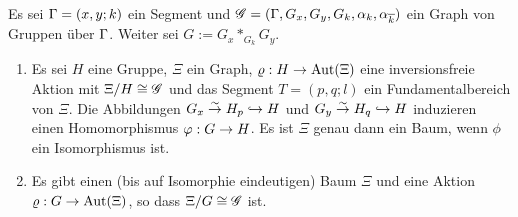 \documentclass[a4paper, 12pt, twoside]{article}
\begin{document}
\SATZ \label{satz_segment}
Es sei $\Gamma=(x,y;k)$ ein Segment und
$\mathscr{G}=(\Gamma,G_x,G_y,G_k,\alpha_k,\alpha_{\overline{k}})$
ein Graph von Gruppen über $\Gamma$.
Weiter sei $G:=G_x *_{G_k} G_y$.
\begin{enumerate}
\item Es sei $H$ eine Gruppe, $\Xi$ ein Graph,
$\varrho:H\rightarrow\mathrm{Aut}(\Xi)$ eine inversionsfreie Aktion
mit $\Xi/H\cong\mathscr{G}$ und das Segment $T=(p,q;l)$ ein
Fundamentalbereich von $\Xi$.
Die Abbildungen
$G_x \overset{\sim}{\rightarrow} H_p \hookrightarrow H$ und
$G_y \overset{\sim}{\rightarrow} H_q \hookrightarrow H$
induzieren einen Homomorphismus
$\varphi:G \rightarrow H$. Es ist $\Xi$ genau dann ein Baum, wenn
$\phi$ ein Isomorphismus ist.
\item Es gibt einen (bis auf Isomorphie eindeutigen) Baum $\Xi$ 
und eine Aktion $\varrho:G\rightarrow\mathrm{Aut}(\Xi)$, so dass
$\Xi/G\cong\mathscr{G}$ ist.
\end{enumerate}
\end{document}
